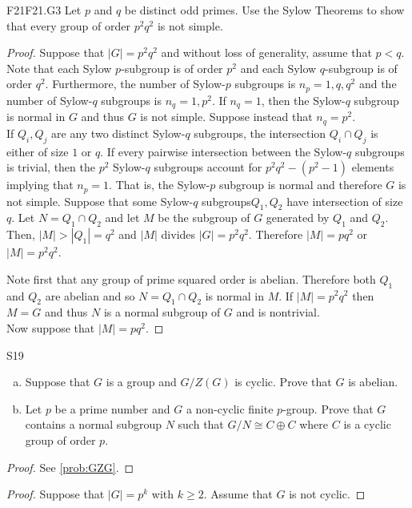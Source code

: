 \documentclass[../AlgebraQualSolutions.tex]{subfiles}
\begin{document}
	
	\begin{prob}{F21}{F21.G3}
	Let $p$ and $q$ be distinct odd primes. Use the Sylow Theorems to show that every group of order $p^2q^2$ is not simple.
	\end{prob}	
	
	\begin{proof}
	Suppose that $|G| = p^2q^2$ and without loss of generality, assume that $p < q$. Note that each Sylow $p$-subgroup is of order $p^2$ and each Sylow $q$-subgroup is of order $q^2$. Furthermore, the number of Sylow-$p$ subgroups is $n_p = 1, q, q^2$ and the number of Sylow-$q$ subgroups is $n_q = 1, p^2$. If $n_q = 1$, then the Sylow-$q$ subgroup is normal in $G$ and thus $G$ is not simple. Suppose instead that $n_q = p^2$.\\
	
	If $Q_i, Q_j$ are any two distinct Sylow-$q$ subgroups, the intersection $Q_i \cap Q_j$ is either of size $1$ or $q$. If every pairwise intersection between the Sylow-$q$ subgroups is trivial, then the $p^2$ Sylow-$q$ subgroups account for $p^2q^2 - (p^2 -1)$ elements implying that $n_p = 1$. That is, the Sylow-$p$ subgroup is normal and therefore $G$ is not simple. Suppose that some Sylow-$q$ subgroups$Q_1, Q_2$ have intersection of size $q$. Let $N = Q_1 \cap Q_2$ and let $M$ be the subgroup of $G$ generated by $Q_1$ and $Q_2$. Then, $|M| > |Q_1| = q^2$ and $|M|$ divides $|G| = p^2q^2$. Therefore $|M| = pq^2$ or $|M| = p^2 q^2$. 
	
Note first that any group of prime squared order is abelian. Therefore both $Q_1$ and $Q_2$ are abelian and so $N = Q_1 \cap Q_2$ is normal in $M$. If $|M| = p^2q^2$ then $M=G$ and thus $N$ is a normal subgroup of $G$ and is nontrivial.\\

Now suppose that $|M| = pq^2$. 
	\end{proof}
	
	\begin{prob}{S19}{}
	\begin{enumerate}[(a)]
	\item Suppose that $G$ is a group and $G/Z(G)$ is cyclic. Prove  that $G$ is abelian.
	\item Let $p$ be a prime number and $G$ a non-cyclic finite $p$-group. Prove that $G$ contains a normal subgroup $N$ such that $G/N \cong C \oplus C$ where $C$ is a cyclic group of order $p$.
	\end{enumerate}
	\end{prob}
	
	\begin{proof}
	See \ref{prob:GZG}.
	\end{proof}
	
	\begin{proof}
	Suppose that $|G| = p^k$ with $k \geq 2$. Assume that $G$ is not cyclic.
	\end{proof}
	
\end{document}
